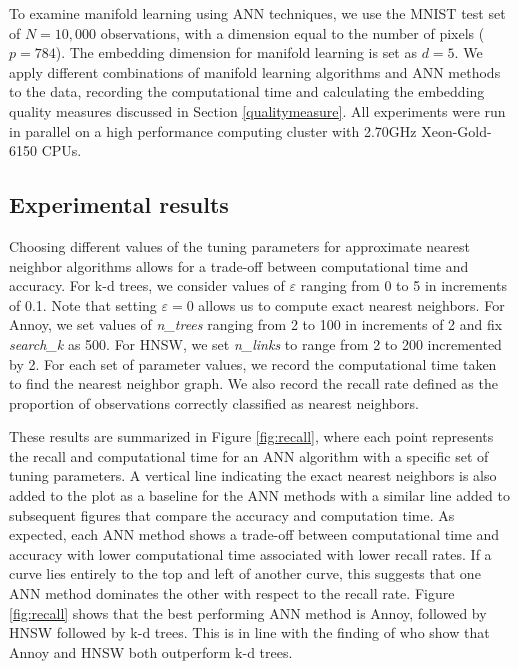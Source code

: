 \documentclass[11pt,a4paper,]{article}
\begin{document}
To examine manifold learning using ANN techniques, we use the MNIST test set of \(N=10,000\) observations, with a dimension equal to the number of pixels (\(p=784\)). The embedding dimension for manifold learning is set as \(d=5\). We apply different combinations of manifold learning algorithms and ANN methods to the data, recording the computational time and calculating the embedding quality measures discussed in Section \ref{qualitymeasure}. All experiments were run in parallel on a high performance computing cluster with 2.70GHz Xeon-Gold-6150 CPUs.

\hypertarget{mnistresults}{%
\subsection{Experimental results}\label{mnistresults}}

Choosing different values of the tuning parameters for approximate nearest neighbor algorithms allows for a trade-off between computational time and accuracy. For k-d trees, we consider values of \(\varepsilon\) ranging from 0 to 5 in increments of 0.1. Note that setting \(\varepsilon=0\) allows us to compute exact nearest neighbors. For Annoy, we set values of \textit{n\_trees} ranging from 2 to 100 in increments of 2 and fix \textit{search\_k} as 500. For HNSW, we set \textit{n\_links} to range from 2 to 200 incremented by 2. For each set of parameter values, we record the computational time taken to find the nearest neighbor graph. We also record the recall rate defined as the proportion of observations correctly classified as nearest neighbors.

These results are summarized in Figure \ref{fig:recall}, where each point represents the recall and computational time for an ANN algorithm with a specific set of tuning parameters.
A vertical line indicating the exact nearest neighbors is also added to the plot as a baseline for the ANN methods with a similar line added to subsequent figures that compare the accuracy and computation time. As expected, each ANN method shows a trade-off between computational time and accuracy with lower computational time associated with lower recall rates. If a curve lies entirely to the top and left of another curve, this suggests that one ANN method dominates the other with respect to the recall rate. Figure \ref{fig:recall} shows that the best performing ANN method is Annoy, followed by HNSW followed by k-d trees. This is in line with the finding of \textcite{Aumuller2020-nk} who show that Annoy and HNSW both outperform k-d trees.
\end{document}
